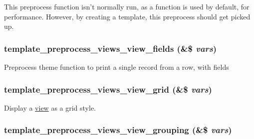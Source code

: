 This preprocess function isn't normally run, as a function is used by default, for performance. However, by creating a template, this preprocess should get picked up. \hypertarget{views_2theme_2theme_8inc_a31ac9f4fe094685ae98063fe1ffbe341}{
\subsubsection[{template\_\-preprocess\_\-views\_\-view\_\-fields}]{\setlength{\rightskip}{0pt plus 5cm}template\_\-preprocess\_\-views\_\-view\_\-fields (\&\$ {\em vars})}}
\label{views_2theme_2theme_8inc_a31ac9f4fe094685ae98063fe1ffbe341}
Preprocess theme function to print a single record from a row, with fields \hypertarget{views_2theme_2theme_8inc_a4e72869a18e87d13a2247003b19a2126}{
\subsubsection[{template\_\-preprocess\_\-views\_\-view\_\-grid}]{\setlength{\rightskip}{0pt plus 5cm}template\_\-preprocess\_\-views\_\-view\_\-grid (\&\$ {\em vars})}}
\label{views_2theme_2theme_8inc_a4e72869a18e87d13a2247003b19a2126}
Display a \hyperlink{classview}{view} as a grid style. \hypertarget{views_2theme_2theme_8inc_a9ae18dd412333dcc63a233072c347a72}{
\subsubsection[{template\_\-preprocess\_\-views\_\-view\_\-grouping}]{\setlength{\rightskip}{0pt plus 5cm}template\_\-preprocess\_\-views\_\-view\_\-grouping (\&\$ {\em vars})}}
\label{views_2theme_2theme_8inc_a9ae18dd412333dcc63a233072c347a72}

